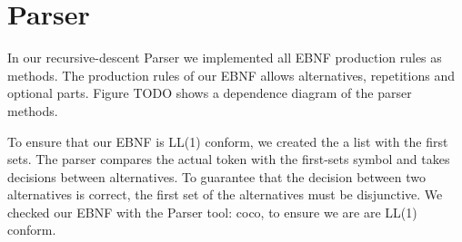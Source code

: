 \section{Parser}

In our recursive-descent Parser we implemented all EBNF production rules as
methods. The production rules of our EBNF allows alternatives, repetitions and optional parts.
Figure TODO shows a dependence diagram of the parser methods.  

To ensure that our EBNF is LL(1) conform, we created the a list with the first sets.
The parser compares the actual token with the first-sets symbol
and takes decisions between alternatives. 
To guarantee that the decision between two alternatives is correct, the first
set of the alternatives must be disjunctive. We checked our EBNF with the Parser tool: coco, to ensure we are are LL(1) conform.



